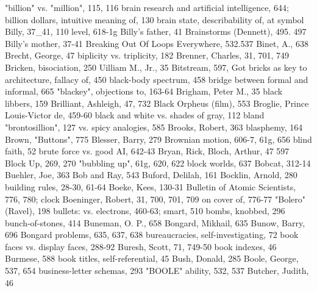 "billion" vs. "million", 115, 116               brain research and artificial intelligence, 644;
billion dollars, intuitive meaning of, 130      brain state, describability of, at symbol
Billy, 37\_41, 110                               level, 618-1g
Billy's father, 41                              Brainstorms (Dennett), 495. 497
Billy's mother, 37-41                           Breaking Out Of Loops Everywhere, 532.537
Binet, A., 638                                  Brecht, George, 47
biplicity vs. triplicity, 182                   Brenner, Charles, 31, 701, 749 Bricken,
bisociation, 250                                  Uilliam M., Jr., 35
Bitstream, 597, Got                             bricks as key to architecture, fallacy of, 450
black-body spectrum, 458                          bridge between formal and informal, 665
"blackey", objections to, 163-64                Brigham, Peter M., 35
black libbers, 159                              Brilliant, Ashleigh, 47, 732
Black Orpheus (film), 553                       Broglie, Prince Louis-Victor de, 459-60
black and white vs. shades of gray, 112 bland   "brontosillion", 127
 vs. spicy analogies, 585                       Brooks, Robert, 363
blasphemy, 164                                  Brown, "Buttons", 775
Blesser, Barry, 279                             Brownian motion, 606-7, 61g, 656
blind faith, 52                                 brute force vs. good AI, 642-43 Bryan, Rick,
Bloch, Arthur, 47                                 597
Block Up, 269, 270                              "bubbling up", 61g, 620, 622
block worlds, 637 Bobcat, 312-14                Buehler, Joe, 363
Bob and Ray, 543                                Buford, Delilah, 161
Bocklin, Arnold, 280                            building rules, 28-30, 61-64
Boeke, Kees, 130-31                             Bulletin of Atomic Scientists, 776, 780; clock
Boeninger, Robert, 31, 700, 701, 709              on cover of, 776-77
"Bolero" (Ravel), 198                           bullets: vs. electrons, 460-63; smart, 510
bombs, knobbed, 296                             bunch-of-stones, 414 Buneman, O. P., 658
Bongard, Mikhail, 635                           Bunow, Barry, 696
Bongard problems, 635, 637, 638                 bureaucracies, self-investigating, 72
book faces vs. display faces, 288-92            Buresh, Scott, 71, 749-50
book indexes, 46                                Burmese, 588
book titles, self-referential, 45               Bush, Donald, 285
Boole, George, 537, 654                         business-letter schemas, 293
"BOOLE" ability, 532, 537                       Butcher, Judith, 46
